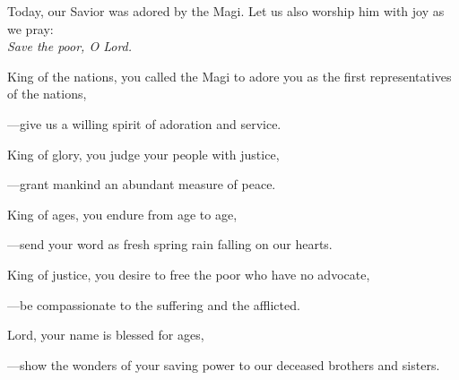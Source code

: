 \intercessions\indent

\begin{hangpar}

Today, our Savior was adored by the Magi. Let us also worship him with joy as we pray:\\
\emph{Save the poor, O Lord.}

\medskip King of the nations, you called the Magi to adore you as the first representatives of the nations,

{\color{red}---\thinspace}give us a willing spirit of adoration and service.

\medskip King of glory, you judge your people with justice,

{\color{red}---\thinspace}grant mankind an abundant measure of peace.

\medskip King of ages, you endure from age to age,

{\color{red}---\thinspace}send your word as fresh spring rain falling on our hearts.

\medskip King of justice, you desire to free the poor who have no advocate,

{\color{red}---\thinspace}be compassionate to the suffering and the afflicted.

\medskip Lord, your name is blessed for ages,

{\color{red}---\thinspace}show the wonders of your saving power to our deceased brothers and sisters.

\medskip

\end{hangpar}